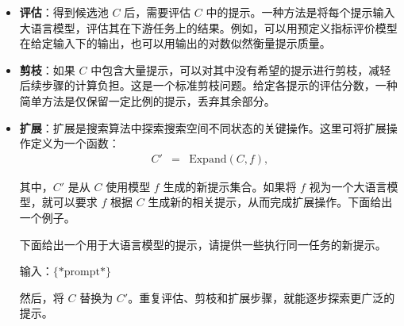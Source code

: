 \begin{itemize}
\begin{tcolorbox}
\endgroup

\end{tcolorbox}
\vspace{0.5em}

这样，大语言模型就能根据所提供的输入和输出，推导出任务对应的指令。

\item \vspace{0.3em} \textbf{评估}：得到候选池 $C$ 后，需要评估 $C$ 中的提示。一种方法是将每个提示输入大语言模型，评估其在下游任务上的结果。例如，可以用预定义指标评价模型在给定输入下的输出，也可以用输出的对数似然衡量提示质量。

\item \vspace{0.3em} \textbf{剪枝}：如果 $C$ 中包含大量提示，可以对其中没有希望的提示进行剪枝，减轻后续步骤的计算负担。这是一个标准剪枝问题。给定各提示的评估分数，一种简单方法是仅保留一定比例的提示，丢弃其余部分。

\item \vspace{0.3em} \textbf{扩展}：扩展是搜索算法中探索搜索空间不同状态的关键操作。这里可将扩展操作定义为一个函数：
    \begin{eqnarray}
    C' & = & \mathrm{Expand}(C, f),
    \end{eqnarray}

    \noindent 其中，$C'$ 是从 $C$ 使用模型 $f$ 生成的新提示集合。如果将 $f$ 视为一个大语言模型，就可以要求 $f$ 根据 $C$ 生成新的相关提示，从而完成扩展操作。下面给出一个例子。

\vspace{0.5em}
\begin{tcolorbox}

\begingroup
\setlength{\leftskip}{2em}
\setlength{\rightskip}{2em}

下面给出一个用于大语言模型的提示，请提供一些执行同一任务的新提示。

\vspace{0.5em}

输入：$\{*\mathrm{prompt}*\}$

\vspace{0.5em}

\underline{\hspace{2em}}

\endgroup

\end{tcolorbox}
\vspace{0.5em}

然后，将 $C$ 替换为 $C'$。重复评估、剪枝和扩展步骤，就能逐步探索更广泛的提示。

\end{itemize}
\vspace{0.5em}

